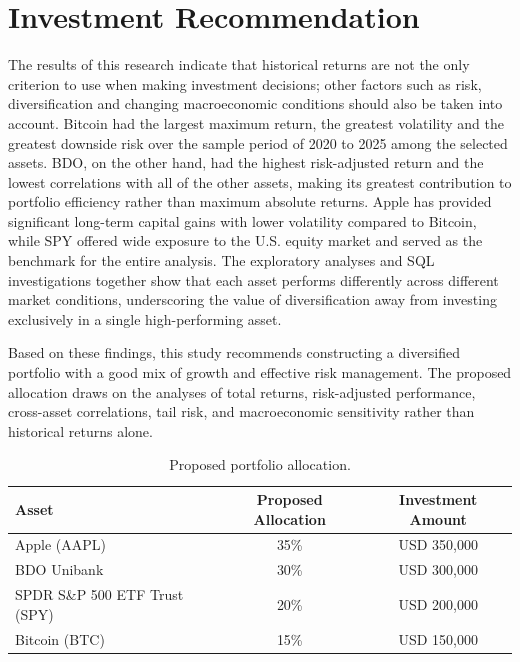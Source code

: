 \section{Investment Recommendation}

The results of this research indicate that historical returns are not the only criterion to use when making investment decisions; other factors such as risk, diversification and changing macroeconomic conditions should also be taken into account. Bitcoin had the largest maximum return, the greatest volatility and the greatest downside risk over the sample period of 2020 to 2025 among the selected assets. BDO, on the other hand, had the highest risk-adjusted return and the lowest correlations with all of the other assets, making its greatest contribution to portfolio efficiency rather than maximum absolute returns. Apple has provided significant long-term capital gains with lower volatility compared to Bitcoin, while SPY offered wide exposure to the U.S. equity market and served as the benchmark for the entire analysis. The exploratory analyses and SQL investigations together show that each asset performs differently across different market conditions, underscoring the value of diversification away from investing exclusively in a single high-performing asset.

Based on these findings, this study recommends constructing a diversified portfolio with a good mix of growth and effective risk management. The proposed allocation draws on the analyses of total returns, risk-adjusted performance, cross-asset correlations, tail risk, and macroeconomic sensitivity rather than historical returns alone.

\begin{table}[H]
\centering
\begin{tabular}{lcc}
\toprule
\textbf{Asset} & \textbf{Proposed Allocation} & \textbf{Investment Amount} \\
\midrule
Apple (AAPL) & 35\% & USD 350,000 \\
BDO Unibank & 30\% & USD 300,000 \\
SPDR S\&P 500 ETF Trust (SPY) & 20\% & USD 200,000 \\
Bitcoin (BTC) & 15\% & USD 150,000 \\
\bottomrule
\end{tabular}
\caption{Proposed portfolio allocation.}
\label{tab:allocation}
\end{table}

